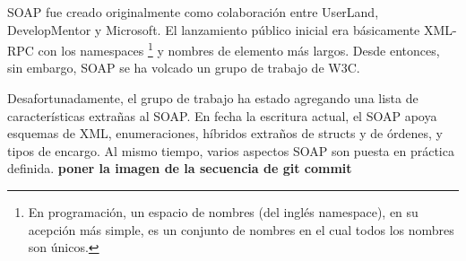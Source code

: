 SOAP fue creado originalmente como colaboración entre UserLand, DevelopMentor y Microsoft. El lanzamiento público inicial era básicamente XML-RPC con los namespaces \footnote{En programación, un espacio de nombres (del inglés namespace), en su acepción más simple, es un conjunto de nombres en el cual todos los nombres son únicos.} y nombres de elemento más largos. Desde entonces, sin embargo, SOAP se ha volcado un grupo de trabajo de W3C.

Desafortunadamente, el grupo de trabajo ha estado agregando una lista de características extrañas al SOAP. En fecha la escritura actual, el SOAP apoya esquemas de XML, enumeraciones, híbridos extraños de structs y de órdenes, y tipos de encargo. Al mismo tiempo, varios aspectos SOAP son puesta en práctica definida.
\textbf{poner la imagen de la secuencia de git commit}

%
